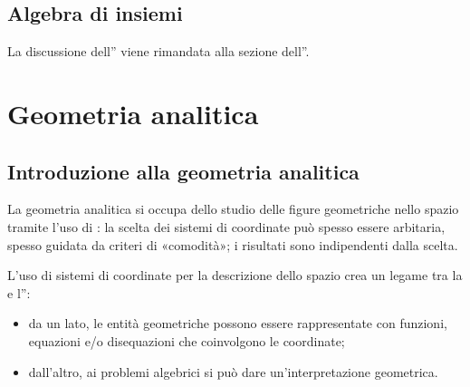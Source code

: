 \documentclass[letterpaper,10pt,italian]{jupyterBook}
\begin{document}
\sphinxstepscope




\chapter{Algebra di insiemi}
\label{\detokenize{ch/algebra/set-algebra-link:algebra-di-insiemi}}\label{\detokenize{ch/algebra/set-algebra-link:math-hs-algebra-set-link}}\label{\detokenize{ch/algebra/set-algebra-link::doc}}
\sphinxAtStartPar
La discussione dell”{\hyperref[\detokenize{ch/set:math-hs-set-algebra}]{}} viene rimandata alla sezione dell”{\hyperref[\detokenize{ch/set:math-hs-set}]{}}.

\sphinxstepscope


\part{Geometria analitica}

\sphinxstepscope




\chapter{Introduzione alla geometria analitica}
\label{\detokenize{ch/analytic_geometry:introduzione-alla-geometria-analitica}}\label{\detokenize{ch/analytic_geometry:geometry-analytic}}\label{\detokenize{ch/analytic_geometry::doc}}
\sphinxAtStartPar
La geometria analitica si occupa dello studio delle figure geometriche nello spazio tramite l’uso di : la scelta dei sistemi di coordinate può spesso essere arbitaria, spesso guidata da criteri di «comodità»; i risultati sono indipendenti dalla scelta.

\sphinxAtStartPar
L’uso di sistemi di coordinate per la descrizione dello spazio crea un legame tra la  e l”:
\begin{itemize}
\item {} 
\sphinxAtStartPar
da un lato, le entità geometriche possono essere rappresentate con funzioni, equazioni e/o disequazioni che coinvolgono le coordinate;

\item {} 
\sphinxAtStartPar
dall’altro, ai problemi algebrici si può dare un’interpretazione geometrica.

\end{itemize}
\end{document}
